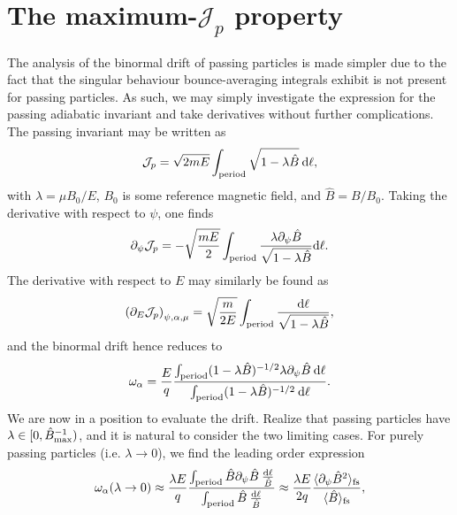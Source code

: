 \section{The maximum-$\mathcal{J}_p$ property}
The analysis of the binormal drift of passing particles is made simpler due to the fact that the singular behaviour bounce-averaging integrals exhibit is not present for passing particles. As such, we may simply investigate the expression for the passing adiabatic invariant and take derivatives without further complications. The passing invariant may be written as
\begin{equation}
    \mathcal{J}_p = \sqrt{2 m E }  \int_{\rm period} \sqrt{1 - \lambda \hat{B}} \: \mathrm{d} \ell,
\end{equation}
with $\lambda = \mu B_0/ E$, $B_0$ is some reference magnetic field, and $\hat{B} = B/B_0$. Taking the derivative with respect to $\psi$, one finds
\begin{equation}
    \partial_\psi \mathcal{J}_p = - \sqrt{\frac{m E}{2}} \int_{\rm period} \frac{\lambda \partial_\psi \hat{B}}{\sqrt{1 - \lambda \hat{B}}} \mathrm{d} \ell.
\end{equation}
The derivative with respect to $E$ may similarly be found as
\begin{equation}
    \left( \partial_E \mathcal{J}_p \right)_{\psi,\alpha,\mu} = \sqrt{\frac{m}{2E}} \int_{\rm period} \frac{\mathrm{d} \ell}{\sqrt{1 - \lambda \hat{B}}},
\end{equation}
and the binormal drift hence reduces to
\begin{equation}
    \omega_\alpha = \frac{E}{q} \frac{\int_{\rm period} (1 - \lambda \hat{B})^{-1/2} \lambda \partial_\psi \hat{B} \: \mathrm{d} \ell }{\int_{\rm period} (1 - \lambda \hat{B})^{-1/2} \: \mathrm{d} \ell}.
\end{equation}
We are now in a position to evaluate the drift. Realize that passing particles have $\lambda \in [0,\hat{B}_{\rm  max}^{-1})$, and it is natural to consider the two limiting cases. For purely passing particles (i.e. $\lambda \rightarrow 0$), we find the leading order expression
\begin{equation}
    \omega_\alpha (\lambda \rightarrow 0) \approx \frac{\lambda E}{q} \frac{\int_{\rm period} \hat{B} \partial_\psi \hat{B} \: \frac{\mathrm{d} \ell}{\hat{B}} }{\int_{\rm period} \hat{B} \: \frac{\mathrm{d} \ell}{\hat{B}}} \approx \frac{\lambda E}{2q} \frac{\langle \partial_\psi \hat{B}^2 \rangle_{\rm fs}}{\langle\hat{B} \rangle_{\rm fs}},
\end{equation}

